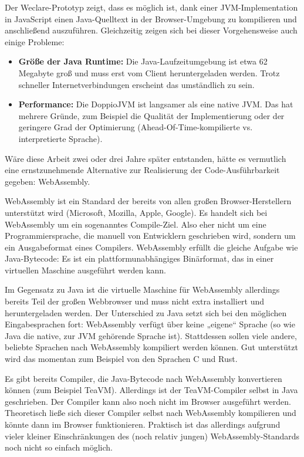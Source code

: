 Der Weclare-Prototyp zeigt, dass es möglich ist, dank einer JVM-Implementation in JavaScript einen Java-Quelltext in der Browser-Umgebung zu kompilieren und anschließend auszuführen. Gleichzeitig zeigen sich bei dieser Vorgehensweise auch einige Probleme:

\begin{itemize}
    \item \textbf{Größe der Java Runtime:} Die Java-Laufzeitumgebung ist etwa 62 Megabyte groß und muss erst vom Client heruntergeladen werden. Trotz schneller Internetverbindungen erscheint das umständlich zu sein.
    \item \textbf{Performance:} Die DoppioJVM ist langsamer als eine native JVM. Das hat mehrere Gründe, zum Beispiel die Qualität der Implementierung oder der geringere Grad der Optimierung (Ahead-Of-Time-kompilierte vs. interpretierte Sprache).
\end{itemize}

Wäre diese Arbeit zwei oder drei Jahre später entstanden, hätte es vermutlich eine ernstzunehmende Alternative zur Realisierung der Code-Ausführbarkeit gegeben: WebAssembly.

WebAssembly ist ein Standard der bereits von allen großen Browser-Herstellern unterstützt wird (Microsoft, Mozilla, Apple, Google). Es handelt sich bei WebAssembly um ein sogenanntes Compile-Ziel. Also eher nicht um eine Programmiersprache, die manuell von Entwicklern geschrieben wird, sondern um ein Ausgabeformat eines Compilers. WebAssembly erfüllt die gleiche Aufgabe wie Java-Bytecode: Es ist ein plattformunabhängiges Binärformat, das in einer virtuellen Maschine ausgeführt werden kann.

Im Gegensatz zu Java ist die virtuelle Maschine für WebAssembly allerdings bereits Teil der großen Webbrowser und muss nicht extra installiert und heruntergeladen werden. Der Unterschied zu Java setzt sich bei den möglichen Eingabesprachen fort: WebAssembly verfügt über keine „eigene“ Sprache (so wie Java die native, zur JVM gehörende Sprache ist). Stattdessen sollen viele andere, beliebte Sprachen nach WebAssembly kompiliert werden können. Gut unterstützt wird das momentan zum Beispiel von den Sprachen C und Rust.

Es gibt bereits Compiler, die Java-Bytecode nach WebAssembly konvertieren können (zum Beispiel TeaVM). Allerdings ist der TeaVM-Compiler selbst in Java geschrieben. Der Compiler kann also noch nicht im Browser ausgeführt werden. Theoretisch ließe sich dieser Compiler selbst nach WebAssembly kompilieren und könnte dann im Browser funktionieren. Praktisch ist das allerdings aufgrund vieler kleiner Einschränkungen des (noch relativ jungen) WebAssembly-Standards noch nicht so einfach möglich.

